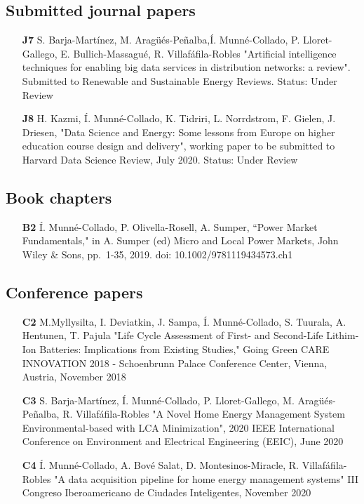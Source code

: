 \subsection*{Submitted journal papers}
\begin{itemize}
	\item [\textbf{J7}] S. Barja-Mart\'{i}nez, M. Arag\"{u}\'{e}s-Pe\~{n}alba,\'{I}. Munn\'{e}-Collado, P. Lloret-Gallego, E. Bullich-Massagu\'{e}, R. Villaf\'{a}fila-Robles "Artificial intelligence techniques for enabling big data services in distribution networks: a review". Submitted to Renewable and Sustainable Energy Reviews. Status: Under Review
	\item [\textbf{J8}] H. Kazmi, \'{I}. Munn\'{e}-Collado, K. Tidriri, L. Norrdstrom, F. Gielen, J. Driesen, "Data Science and Energy: Some lessons from Europe on higher education course design and delivery", working paper to be submitted to Harvard Data Science Review, July 2020. Status: Under Review
\end{itemize}

	
\subsection*{Book chapters}

\begin{itemize}
	\item[\textbf{B2}] \'{I}. Munn\'{e}-Collado, P. Olivella-Rosell, A. Sumper, ``Power Market Fundamentals," in A. Sumper (ed) Micro and Local Power Markets, John Wiley \& Sons, pp.~1-35, 2019. doi: 10.1002/9781119434573.ch1
\end{itemize}	


\subsection*{Conference papers}

\begin{itemize}
	\item [\textbf{C2}] M.Myllysilta, I. Deviatkin, J. Sampa,  \'{I}. Munn\'{e}-Collado, S. Tuurala, A. Hentunen, T. Pajula  "Life Cycle Assessment of First- and Second-Life Lithim-Ion Batteries: Implications from Existing Studies," Going Green CARE INNOVATION 2018 - Schoenbrunn Palace Conference Center, Vienna, Austria, November 2018
	\item [\textbf{C3}] S. Barja-Mart\'{i}nez, \'{I}. Munn\'{e}-Collado, P. Lloret-Gallego, M. Arag\"{u}\'{e}s-Pe\~{n}alba, R. Villaf\'{a}fila-Robles "A Novel Home Energy Management System Environmental-based with LCA Minimization", 2020 IEEE International Conference on Environment and Electrical Engineering (EEIC), June 2020
	\item [\textbf{C4}] \'{I}. Munn\'{e}-Collado, A. Bov\'{e} Salat, D. Montesinos-Miracle, R. Villaf\'{a}fila-Robles "A data acquisition pipeline for home energy management systems" III Congreso Iberoamericano de Ciudades Inteligentes, November 2020

\end{itemize}


